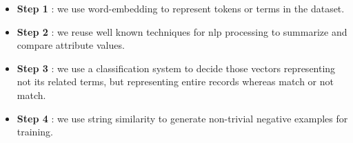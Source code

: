 \documentclass[11pt]{article}
\begin{document}
\begin{itemize}
\item \textbf{Step 1} : we use word-embedding to represent tokens or terms in the dataset.

\item \textbf{Step 2} : we reuse well known techniques for nlp processing to summarize and compare attribute values.

\item \textbf{Step 3} : we use a classification system to decide those vectors representing not its related terms, but representing entire records whereas match or not match.

\item \textbf{Step 4} : we use string similarity to generate non-trivial negative examples for training.
\end{itemize}
\end{document}
